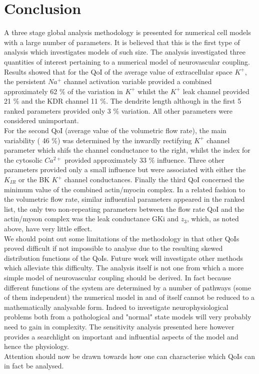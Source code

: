 \section{Conclusion}
 A three stage global analysis methodology is presented for numerical cell models with a large number of parameters. It is believed that this is the first type of analysis which investigates models of such size. The analysis investigated three quantities of interest pertaining to a numerical model of neurovascular coupling. Results showed that for the QoI of the average value of extracellular space $K^+$, the persistent $Na^+$  channel activation variable provided a combined approximately 62 \% of the variation in $K^+$ whilst the $K^+$ leak channel provided 21 \% and the KDR channel 11 \%. The dendrite length although in the first 5 ranked parameters provided only 3 \% variation. All other parameters were considered unimportant. \\
 For the second QoI (average value of the volumetric flow rate), the main variability ( 46 \%) was determined by the inwardly rectifying $K^+$ channel parameter which shifs the channel conductance to the right, whilst the index for the cytosolic $Ca^{2+}$ provided approximately 33 \% influence. Three other parameters provided only a small influence but were associated with either the $K_{IR}$  or the BK $K^+$ channel conductances. 
 Finally the third QoI concerned the minimum value of the combined actin/myocin complex. In a related fashion to the volumetric flow rate, similar influential parameters appeared in the ranked list, the only two non-repeating parameters between the flow rate QoI and the actin/myson complex was the leak conductance GKi and $z_3$, which, as noted above, have very little effect. \\
 We should point out some limitations of the methodology in that other QoIs proved difficult if not impossible to analyse due to the resulting skewed distribution functions of the QoIs. Future work will investigate other methods which alleviate this difficulty. 
 The analysis itself is not one from which a more simple model of neurovascular coupling should be derived. In fact because different functions of the system are determined by a number of pathways (some of them independent) the numerical model in and of itself cannot be reduced to a mathematically analysable form. Indeed to investigate neurophysiological problems both from a pathological and "normal" state models will very probably need to gain in complexity. The sensitivity analysis presented here however provides a searchlight on important and influential aspects of the model and hence the physiology. \\
 Attention should now be drawn towards how one can characterise which QoIs can in fact be analysed. 
%
%
%
